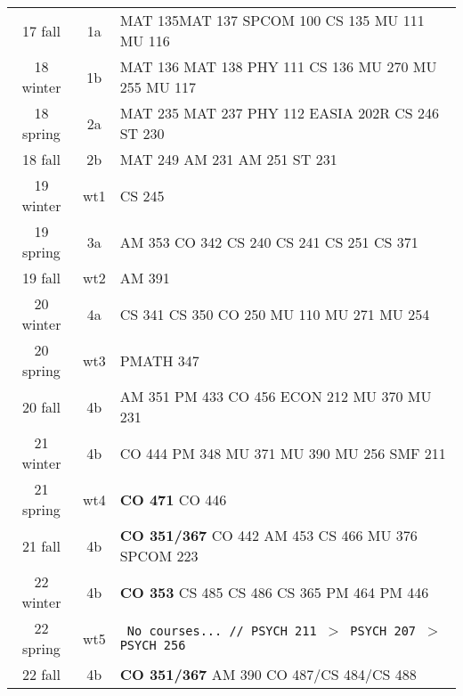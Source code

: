 \documentclass[convert]{standalone}
\begin{document}
\begin{tabular}{|c | c | l |}
	\hline
	17 fall & 1a & MAT 135\quad MAT 137 \quad SPCOM 100 \quad CS 135 \quad MU 111 \quad MU 116 \\
	18 winter & 1b & MAT 136 \quad MAT 138 \quad PHY 111 \quad CS 136 \quad MU 270 \quad MU 255 \quad MU 117 \\
	18 spring & 2a & MAT 235 \quad MAT 237 \quad PHY 112 \quad EASIA 202R \quad CS 246 \quad ST  230 \\
	18 fall & 2b & MAT 249 \quad AM 231 \quad AM 251 \quad ST  231 \\
	19 winter & wt1 & CS 245 \\
	19 spring & 3a & AM 353 \quad CO 342 \quad CS 240 \quad CS 241 \quad CS 251 \quad CS 371 \\
	19 fall & wt2 & AM 391 \\
	20 winter & 4a & CS 341 \quad CS 350 \quad CO 250  \quad MU 110 \quad MU 271 \quad MU 254 \\
	20 spring & wt3 & PMATH 347 \\
	20 fall & 4b & AM 351  \quad PM 433  \quad CO 456 \quad ECON 212  \quad MU 370 \quad MU 231   \\
	21 winter & 4b & CO 444 \quad PM 348   \quad MU 371   \quad MU 390 \quad MU 256 \quad SMF 211 \\
	21 spring & wt4 & {\color{red}\textbf{CO 471}} \quad CO 446 \quad   \\
	21 fall & 4b &{\color{white} \textbf{CO 351/367}} \quad CO 442  \quad AM 453 \quad CS 466 \quad MU 376 \quad SPCOM 223      \\
	22 winter & 4b & {\color{red} \textbf{CO 353}}  \quad CS 485 \quad CS 486 \quad CS 365 \quad PM 464 \quad PM 446     \\
	22 spring & wt5 & {\tt  \color{gray} No courses... // PSYCH 211 $>$ PSYCH 207 $>$ PSYCH 256} \\
	22 fall & 4b & {\color{red} \textbf{CO 351/367}} \quad  AM 390 \quad  CO 487/CS 484/CS 488   \\\hline

\end{tabular}
\end{document}

